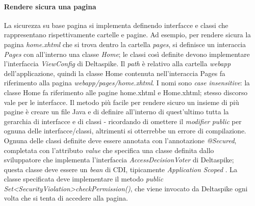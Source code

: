 \paragraph{Rendere sicura una pagina} 
La sicurezza su base pagina si implementa definendo interfacce e classi che rappresentano rispettivamente cartelle e pagine. Ad esempio, per rendere sicura la pagina \textsl{home.xhtml} che si trova dentro la cartella \textsl{pages}, si definisce un interaccia \textsl{Pages} con all'interno una classe \textsl{Home}; le classi così definite devono implementare l'interfaccia \textsl{ViewConfig} di Deltaspike. Il \textit{path} è relativo alla cartella \textsl{webapp} dell'applicazione, quindi la classe Home contenuta nell'interaccia Pages fa riferimento alla pagina \textsl{webapp/pages/home.xhtml}. I nomi sono \textit{case insensitive}: la classe Home fa riferimento alle pagine home.xhtml e Home.xhtml; stesso discorso vale per le interfacce.\newline
Il metodo più facile per rendere sicuro un insieme di più pagine è creare un file Java e di definire all'interno di quest'ultimo tutta la gerarchia di interfacce e di classi - ricordando di omettere il \textit{modifier} \textsl{public} per ognuna delle interfacce/classi, altrimenti si otterrebbe un errore di compilazione.\newline
Ognuna delle classi definite deve essere annotata con l'annotazione \textsl{@Secured}, completata con l'attributo \textsl{value} che specifica una classe definita dallo sviluppatore che implementa l'interfaccia \textsl{AccessDecisionVoter} di Deltaspike; questa classe deve essere un \textit{bean} di CDI, tipicamente \textsl{Application Scoped} .
La classe specificata deve implementare il metodo \textsl{public Set\textless SecurityViolation\textgreater \space checkPermission()}, che viene invocato da Deltaspike ogni volta che si tenta di accedere alla pagina.\newline
